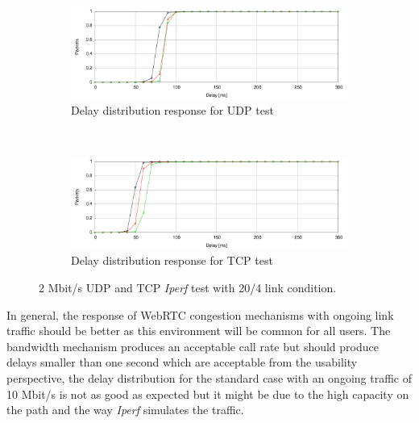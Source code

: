 \begin{figure}
        \centering
        \begin{subfigure}[b]{0.5\textwidth}
                \centering
                \includegraphics[width=\textwidth]{./figures/2m_udp_total_delay_distribution.pdf}
                \caption{Delay distribution response for UDP test}
                \label{fig:2m_udp_total_delay_distribution}
        \end{subfigure}%
        ~ %
        \begin{subfigure}[b]{0.5\textwidth}
                \centering
                \includegraphics[width=\textwidth]{./figures/2m_tcp_total_delay_distribution.pdf}
                \caption{Delay distribution response for TCP test}
                \label{fig:2m_tcp_total_delay_distribution}
        \end{subfigure}
        \caption[2 Mbit/s UDP and TCP {\it Iperf} test with 20/4 link condition]{2 Mbit/s UDP and TCP {\it Iperf} test with 20/4 link condition.}
        \label{fig:2m_tcp_udp_distribution}
\end{figure}

In general, the response of WebRTC congestion mechanisms with ongoing link traffic should be better as this environment will be common for all users. The bandwidth mechanism produces an acceptable call rate but should produce delays smaller than one second which are acceptable from the usability perspective, the delay distribution for the standard case with an ongoing traffic of 10 Mbit/s is not as good as expected but it might be due to the high capacity on the path and the way {\it Iperf} simulates the traffic.

